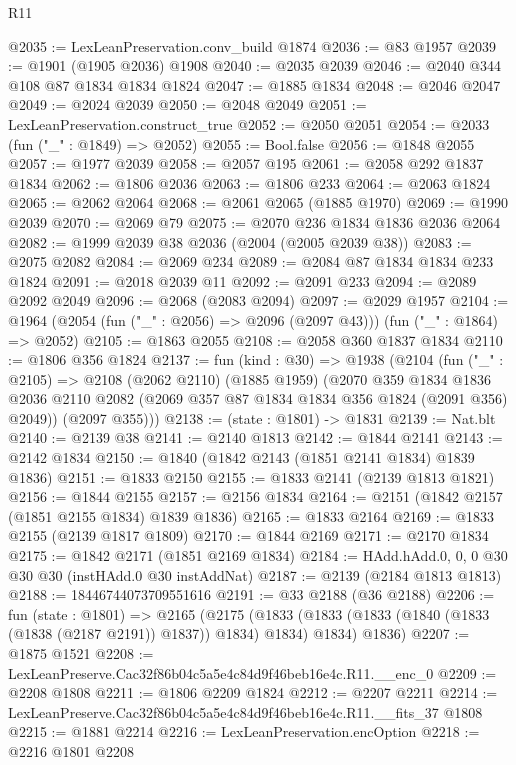 \begin{lexlean}{R11}
\begin{coremodule}
@2035 := LexLeanPreservation.conv_build @1874
@2036 := @83 @1957
@2039 := @1901 (@1905 @2036) @1908
@2040 := @2035 @2039
@2046 := @2040 @344 @108 @87 @1834 @1834 @1824
@2047 := @1885 @1834
@2048 := @2046 @2047
@2049 := @2024 @2039
@2050 := @2048 @2049
@2051 := LexLeanPreservation.construct_true
@2052 := @2050 @2051
@2054 := @2033 (fun ("_" : @1849) => @2052)
@2055 := Bool.false
@2056 := @1848 @2055
@2057 := @1977 @2039
@2058 := @2057 @195
@2061 := @2058 @292 @1837 @1834
@2062 := @1806 @2036
@2063 := @1806 @233
@2064 := @2063 @1824
@2065 := @2062 @2064
@2068 := @2061 @2065 (@1885 @1970)
@2069 := @1990 @2039
@2070 := @2069 @79
@2075 := @2070 @236 @1834 @1836 @2036 @2064
@2082 := @1999 @2039 @38 @2036 (@2004 (@2005 @2039 @38))
@2083 := @2075 @2082
@2084 := @2069 @234
@2089 := @2084 @87 @1834 @1834 @233 @1824
@2091 := @2018 @2039 @11
@2092 := @2091 @233
@2094 := @2089 @2092 @2049
@2096 := @2068 (@2083 @2094)
@2097 := @2029 @1957
@2104 := @1964 (@2054 (fun ("_" : @2056) => @2096 (@2097 @43))) (fun ("_" : @1864) => @2052)
@2105 := @1863 @2055
@2108 := @2058 @360 @1837 @1834
@2110 := @1806 @356 @1824
@2137 := fun (kind : @30) =>
  @1938
    (@2104
      (fun ("_" : @2105) =>
      @2108
        (@2062 @2110)
        (@1885 @1959)
        (@2070
          @359
          @1834
          @1836
          @2036
          @2110
          @2082
          (@2069 @357 @87 @1834 @1834 @356 @1824 (@2091 @356) @2049))
        (@2097 @355)))
@2138 := (state : @1801) -> @1831
@2139 := Nat.blt
@2140 := @2139 @38
@2141 := @2140 @1813
@2142 := @1844 @2141
@2143 := @2142 @1834
@2150 := @1840 (@1842 @2143 (@1851 @2141 @1834) @1839 @1836)
@2151 := @1833 @2150
@2155 := @1833 @2141 (@2139 @1813 @1821)
@2156 := @1844 @2155
@2157 := @2156 @1834
@2164 := @2151 (@1842 @2157 (@1851 @2155 @1834) @1839 @1836)
@2165 := @1833 @2164
@2169 := @1833 @2155 (@2139 @1817 @1809)
@2170 := @1844 @2169
@2171 := @2170 @1834
@2175 := @1842 @2171 (@1851 @2169 @1834)
@2184 := HAdd.hAdd.{0, 0, 0} @30 @30 @30 (instHAdd.{0} @30 instAddNat)
@2187 := @2139 (@2184 @1813 @1813)
@2188 := 18446744073709551616
@2191 := @33 @2188 (@36 @2188)
@2206 := fun (state : @1801) =>
  @2165
    (@2175
      (@1833 (@1833 (@1833 (@1840 (@1833 (@1838 (@2187 @2191)) @1837)) @1834) @1834) @1834)
      @1836)
@2207 := @1875 @1521
@2208 := LexLeanPreserve.Cac32f86b04c5a5e4c84d9f46beb16e4c.R11.__enc_0
@2209 := @2208 @1808
@2211 := @1806 @2209 @1824
@2212 := @2207 @2211
@2214 := LexLeanPreserve.Cac32f86b04c5a5e4c84d9f46beb16e4c.R11.__fits_37 @1808
@2215 := @1881 @2214
@2216 := LexLeanPreservation.encOption
@2218 := @2216 @1801 @2208

\end{coremodule}
\end{lexlean}
